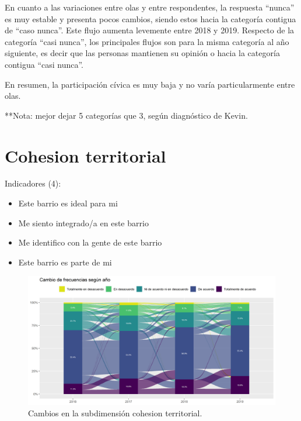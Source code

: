 \documentclass[
  12pt,
]{book}
\begin{document}
En cuanto a las variaciones entre olas y entre respondentes, la respuesta ``nunca'' es muy estable y presenta pocos cambios, siendo estos hacia la categoría contigua de ``caso nunca''. Este flujo aumenta levemente entre 2018 y 2019. Respecto de la categoría ``casi nunca'', los principales flujos son para la misma categoría al año siguiente, es decir que las personas mantienen su opinión o hacia la categoría contigua ``casi nunca''.

En resumen, la participación cívica es muy baja y no varía particularmente entre olas.

**Nota: mejor dejar 5 categorías que 3, según diagnóstico de Kevin.

\hypertarget{cohesion-territorial}{%
\section{Cohesion territorial}\label{cohesion-territorial}}

Indicadores (4):

\begin{itemize}
\item
  Este barrio es ideal para mi
\item
  Me siento integrado/a en este barrio
\item
  Me identifico con la gente de este barrio
\item
  Este barrio es parte de mi
\end{itemize}

\begin{figure}[H]

{\centering \includegraphics[width=1\linewidth,height=1\textheight]{output/graphs/alluvial_cohesion_territorial} 

}

\caption{Cambios en la subdimensión cohesion territorial.}\label{fig:alluvial-cohesion-territorial}
\end{figure}
\end{document}
